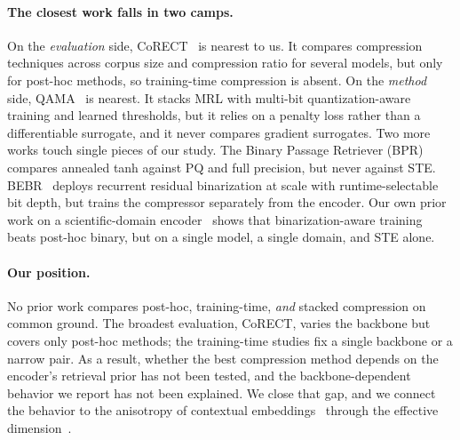 \paragraph{The closest work falls in two camps.}
On the \emph{evaluation} side, CoRECT~\citep{correct2025} is nearest to us. It
compares compression techniques across corpus size and compression ratio for
several models, but only for post-hoc methods, so training-time compression is
absent. On the \emph{method} side, QAMA~\citep{qama2025} is nearest. It stacks
MRL with multi-bit quantization-aware training and learned thresholds, but it
relies on a penalty loss rather than a differentiable surrogate, and it never
compares gradient surrogates. Two more works touch single pieces of our study.
The Binary Passage Retriever (BPR)~\citep{yamada2021efficient} compares annealed
tanh against PQ and full precision, but never against STE. BEBR~\citep{gan2023binary}
deploys recurrent residual binarization at scale with runtime-selectable bit
depth, but trains the compressor separately from the encoder. Our own prior work
on a scientific-domain encoder~\citep{pantha2026indussde} shows that
binarization-aware training beats post-hoc binary, but on a single model, a single
domain, and STE alone.

\paragraph{Our position.}
No prior work compares post-hoc, training-time, \emph{and} stacked compression on
common ground. The broadest evaluation, CoRECT, varies the backbone but covers
only post-hoc methods; the training-time studies fix a single backbone or a
narrow pair. As a result, whether the best compression method depends on the
encoder's retrieval prior has not been tested, and the backbone-dependent
behavior we report has not been explained. We close that gap, and we connect the
behavior to the anisotropy of contextual
embeddings~\citep{ethayarajh2019contextual} through the effective
dimension~\citep{litwinkumar2017optimal, gao2017theory}.
